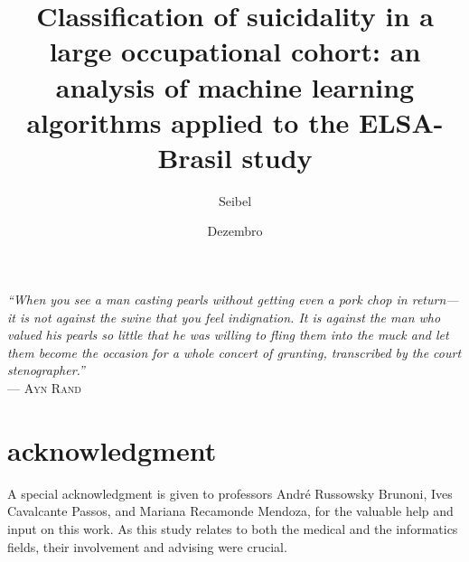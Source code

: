 \documentclass[ecp,tc,english]{iiufrgs}
\title{Classification of suicidality in a large occupational cohort: an analysis of machine learning algorithms applied to the ELSA-Brasil study}
\author{Seibel}{Gabriel de Souza}
\date{Dezembro}{2020}
\begin{document}
    \maketitle

    \clearpage
    \begin{flushright}
        \mbox{}\vfill
        {\sffamily\itshape
        ``When you see a man casting pearls without getting even a pork chop in return—it is not against the swine that you feel indignation.
        It is against the man who valued his pearls so little that he was willing to fling them into the muck and let them become the occasion for a whole concert of grunting, transcribed by the court stenographer.''\\}
        --- \textsc{Ayn Rand}
    \end{flushright}

    \chapter*{acknowledgment}
    A special acknowledgment is given to professors André Russowsky Brunoni, Ives Cavalcante Passos, and Mariana Recamonde Mendoza, for the valuable help and input on this work.
    As this study relates to both the medical and the informatics fields, their involvement and advising were crucial.
\end{document}

